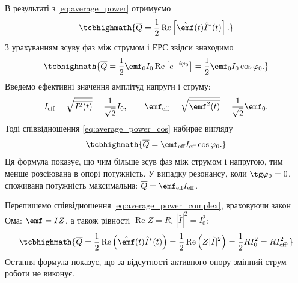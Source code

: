 В результаті з \eqref{eq:average_power} отримуємо
\begin{equation}\label{eq:average_power_complex}
	\tcbhighmath{
		\overline{Q} = \frac{1}{2}\operatorname{Re}\left[\hat{\emf}(t)\hat{I}^*(t)\right].
	}
\end{equation}
З урахуванням зсуву фаз між струмом і ЕРС звідси знаходимо
\begin{equation}\label{eq:average_power_cos}
	\tcbhighmath{
		\overline{Q} = \frac{1}{2}\emf_0 I_0 \operatorname{Re}\left[e^{-i\varphi_0}\right]
		= \frac{1}{2}\emf_0 I_0 \cos\varphi_0.
	}
\end{equation}
Введемо ефективні значення амплітуд напруги і струму:
\begin{equation}\label{eq:effective_values}
	I_{\text{eff}} = \sqrt{\overline{I^2(t)}} = \frac{1}{\sqrt{2}}I_0, \qquad
	\emf_{\text{eff}} = \sqrt{\overline{\emf^2(t)}} = \frac{1}{\sqrt{2}}\emf_0.
\end{equation}
Тоді співвідношення \eqref{eq:average_power_cos} набирає вигляду
\begin{equation}\label{eq:average_power_effective}
	\tcbhighmath{
		\overline{Q} = \emf_{\text{eff}} I_{\text{eff}} \cos\varphi_0.
	}
\end{equation}
Ця формула показує, що чим більше зсув фаз між струмом і напругою, тим менше розсіювана в опорі потужність. У
випадку резонансу, коли $\tg\varphi_0 = 0$, споживана потужність максимальна: $\overline{Q} = \emf_{\text{eff}} I_{\text{eff}}$.

Перепишемо співвідношення \eqref{eq:average_power_complex}, враховуючи закон Ома: $\emf = IZ$, а
також рівності $\operatorname{Re} Z = R$, $|\hat{I}|^2 = I_0^2$:
\begin{equation}\label{eq:average_power_resistance}
	\tcbhighmath{
		\overline{Q} = \frac{1}{2}\operatorname{Re}\left(\hat{\emf}(t)\hat{I}^*(t)\right)
		= \frac{1}{2}\operatorname{Re}\left(Z|\hat{I}|^2\right)
		= \frac{1}{2}RI_0^2 = RI_{\text{eff}}^2.
	}
\end{equation}
Остання формула показує, що за відсутності активного опору змінний струм роботи не виконує.

